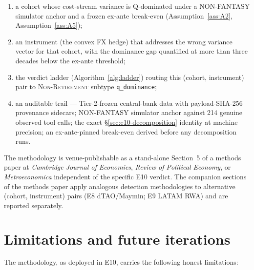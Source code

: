 \documentclass[11pt,letterpaper]{article}
\theoremstyle{assumption}
\begin{document}
\begin{enumerate}[label=(\alph*)]
\item a cohort whose cost-stream variance is Q-dominated under a
  NON-FANTASY simulator anchor and a frozen ex-ante break-even
  (Assumption~\ref{ass:A2}, Assumption~\ref{ass:A5});
\item an instrument (the convex FX hedge) that addresses the wrong
  variance vector for that cohort, with the dominance gap quantified at
  more than three decades below the ex-ante threshold;
\item the verdict ladder (Algorithm~\ref{alg:ladder}) routing this
  (cohort, instrument) pair to \textsc{Non-Retirement} subtype
  \texttt{q\_dominance};
\item an auditable trail --- Tier-2-frozen central-bank data with
  payload-SHA-256 provenance sidecars; NON-FANTASY simulator anchor
  against 214 genuine observed tool calls; the exact \S\ref{sec:e10-decomposition}
  identity at machine precision; an ex-ante-pinned break-even derived
  before any decomposition runs.
\end{enumerate}

The methodology is venue-publishable as a stand-alone Section~5 of a
methods paper at \emph{Cambridge Journal of Economics}, \emph{Review of
Political Economy}, or \emph{Metroeconomica} independent of the specific
E10 verdict. The companion sections of the methods paper apply analogous
detection methodologies to alternative (cohort, instrument) pairs (E8
dTAO/Maymin; E9 LATAM RWA) and are reported separately.

\section{Limitations and future iterations}
\label{sec:e10-limitations}

The methodology, as deployed in E10, carries the following honest
limitations:
\end{document}
